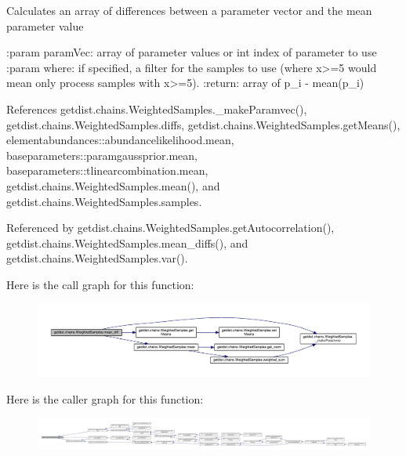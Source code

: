 \begin{DoxyVerb}Calculates an array of differences between a parameter vector and the mean parameter value

:param paramVec: array of parameter values or int index of parameter to use
:param where: if specified, a filter for the samples to use (where x>=5 would mean only process samples with x>=5).
:return: array of p_i - mean(p_i)
\end{DoxyVerb}
 

References getdist.\+chains.\+Weighted\+Samples.\+\_\+make\+Paramvec(), getdist.\+chains.\+Weighted\+Samples.\+diffs, getdist.\+chains.\+Weighted\+Samples.\+get\+Means(), elementabundances\+::abundancelikelihood.\+mean, baseparameters\+::paramgaussprior.\+mean, baseparameters\+::tlinearcombination.\+mean, getdist.\+chains.\+Weighted\+Samples.\+mean(), and getdist.\+chains.\+Weighted\+Samples.\+samples.



Referenced by getdist.\+chains.\+Weighted\+Samples.\+get\+Autocorrelation(), getdist.\+chains.\+Weighted\+Samples.\+mean\+\_\+diffs(), and getdist.\+chains.\+Weighted\+Samples.\+var().

Here is the call graph for this function\+:
\nopagebreak
\begin{figure}[H]
\begin{center}
\leavevmode
\includegraphics[width=350pt]{classgetdist_1_1chains_1_1WeightedSamples_a4a7ffc36e87801cb74f9ec78896c220b_cgraph}
\end{center}
\end{figure}
Here is the caller graph for this function\+:
\nopagebreak
\begin{figure}[H]
\begin{center}
\leavevmode
\includegraphics[width=350pt]{classgetdist_1_1chains_1_1WeightedSamples_a4a7ffc36e87801cb74f9ec78896c220b_icgraph}
\end{center}
\end{figure}
\mbox{\label{classgetdist_1_1chains_1_1WeightedSamples_a22eba6159f13f1185d7359885a6e927c}} 
